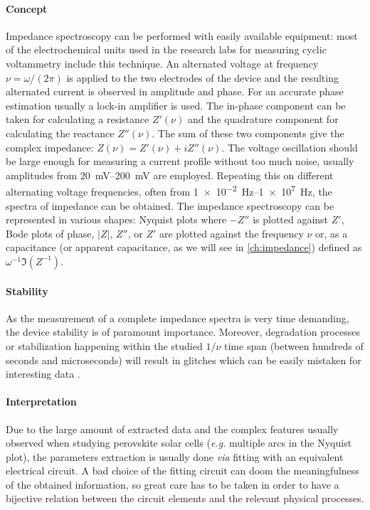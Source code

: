 \paragraph{Concept}
Impedance spectroscopy can be performed with easily available equipment: most of the electrochemical units used in the research labs for measuring cyclic voltammetry include this technique.
An alternated voltage at frequency $\nu = \omega / (2 \pi)$ is applied to the two electrodes of the device and the resulting alternated current is observed in amplitude and phase.
For an accurate phase estimation usually a lock-in amplifier is used.
The in-phase component can be taken for calculating a resistance $Z'(\nu)$ and the quadrature component for calculating the reactance $Z''(\nu)$.
The sum of these two components give the complex impedance: $Z(\nu) = Z'(\nu) + iZ''(\nu)$.
The voltage oscillation should be large enough for measuring a current profile without too much noise, usually amplitudes from \SIrange{20}{200}{\mV} are employed.
Repeating this on different alternating voltage frequencies, often from \SIrange{1e-2}{1e7}{\Hz}, the spectra of impedance can be obtained.
The impedance spectroscopy can be represented in various shapes: Nyquist plots where $-Z''$ is plotted against $Z'$, Bode plots of phase, $|Z|$, $Z''$, or $Z'$ are plotted against the frequency $\nu$ or, as a capacitance (or apparent capacitance, as we will see in \cref{ch:impedance}) defined as $\omega^{-1}\Im(Z^{-1})$.

\paragraph{Stability}
As the measurement of a complete impedance spectra is very time demanding, the device stability is of paramount importance.
Moreover, degradation processes or stabilization happening within the studied $1/\nu$ time span (between hundreds of seconds and microseconds) will result in glitches which can be easily mistaken for interesting data \cite{Jacobs2018,Moia2019}.

\paragraph{Interpretation}
Due to the large amount of extracted data and the complex features usually observed when studying perovskite solar cells (\textsl{e.g.} multiple arcs in the Nyquist plot), the parameters extraction is usually done \textsl{via} fitting with an equivalent electrical circuit.
A bad choice of the fitting circuit can doom the meaningfulness of the obtained information, so great care has to be taken in order to have a bijective relation between the circuit elements and the relevant physical processes. 

